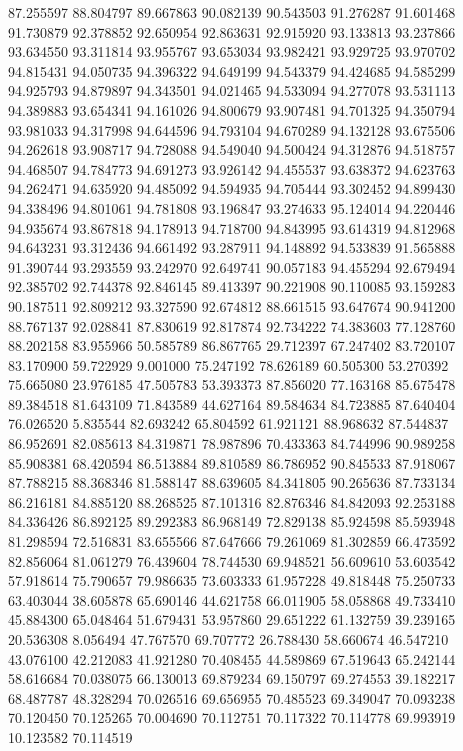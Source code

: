 87.255597
88.804797
89.667863
90.082139
90.543503
91.276287
91.601468
91.730879
92.378852
92.650954
92.863631
92.915920
93.133813
93.237866
93.634550
93.311814
93.955767
93.653034
93.982421
93.929725
93.970702
94.815431
94.050735
94.396322
94.649199
94.543379
94.424685
94.585299
94.925793
94.879897
94.343501
94.021465
94.533094
94.277078
93.531113
94.389883
93.654341
94.161026
94.800679
93.907481
94.701325
94.350794
93.981033
94.317998
94.644596
94.793104
94.670289
94.132128
93.675506
94.262618
93.908717
94.728088
94.549040
94.500424
94.312876
94.518757
94.468507
94.784773
94.691273
93.926142
94.455537
93.638372
94.623763
94.262471
94.635920
94.485092
94.594935
94.705444
93.302452
94.899430
94.338496
94.801061
94.781808
93.196847
93.274633
95.124014
94.220446
94.935674
93.867818
94.178913
94.718700
94.843995
93.614319
94.812968
94.643231
93.312436
94.661492
93.287911
94.148892
94.533839
91.565888
91.390744
93.293559
93.242970
92.649741
90.057183
94.455294
92.679494
92.385702
92.744378
92.846145
89.413397
90.221908
90.110085
93.159283
90.187511
92.809212
93.327590
92.674812
88.661515
93.647674
90.941200
88.767137
92.028841
87.830619
92.817874
92.734222
74.383603
77.128760
88.202158
83.955966
50.585789
86.867765
29.712397
67.247402
83.720107
83.170900
59.722929
9.001000
75.247192
78.626189
60.505300
53.270392
75.665080
23.976185
47.505783
53.393373
87.856020
77.163168
85.675478
89.384518
81.643109
71.843589
44.627164
89.584634
84.723885
87.640404
76.026520
5.835544
82.693242
65.804592
61.921121
88.968632
87.544837
86.952691
82.085613
84.319871
78.987896
70.433363
84.744996
90.989258
85.908381
68.420594
86.513884
89.810589
86.786952
90.845533
87.918067
87.788215
88.368346
81.588147
88.639605
84.341805
90.265636
87.733134
86.216181
84.885120
88.268525
87.101316
82.876346
84.842093
92.253188
84.336426
86.892125
89.292383
86.968149
72.829138
85.924598
85.593948
81.298594
72.516831
83.655566
87.647666
79.261069
81.302859
66.473592
82.856064
81.061279
76.439604
78.744530
69.948521
56.609610
53.603542
57.918614
75.790657
79.986635
73.603333
61.957228
49.818448
75.250733
63.403044
38.605878
65.690146
44.621758
66.011905
58.058868
49.733410
45.884300
65.048464
51.679431
53.957860
29.651222
61.132759
39.239165
20.536308
8.056494
47.767570
69.707772
26.788430
58.660674
46.547210
43.076100
42.212083
41.921280
70.408455
44.589869
67.519643
65.242144
58.616684
70.038075
66.130013
69.879234
69.150797
69.274553
39.182217
68.487787
48.328294
70.026516
69.656955
70.485523
69.349047
70.093238
70.120450
70.125265
70.004690
70.112751
70.117322
70.114778
69.993919
10.123582
70.114519
